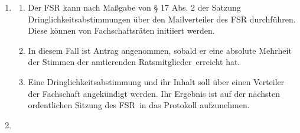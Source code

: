 \documentclass[a4paper, 12pt, ngerman]{article}
\newcommand{\rates}{FSR}
\newcommand{\go}{GO}
\newcommand{\mitglieder}{Ratsmitglieder}
\begin{document}
\begin{enumerate}[leftmargin=0cm]
	\begin{enumerate}[leftmargin=0cm]
		\item Die Sitzungsleitung gibt vor einer Abstimmung den Wortlaut 
		des Antrags bekannt.
		\item Im Falle konkurrierender Anträge ist über den weitestgehenden Antrag zuerst abzustimmen.
		Die Sitzungsleitung schlägt eine Reihung der Anträge vor; über Widerspruch einer antragsstellenden Person entscheiden die anwesenden \mitglieder~durch Abstimmung.
        Sobald ein Antrag die notwendige Mehrheit gefunden hat, entfallen alle Übrigen. 
		\item Abstimmungen erfolgen auf einer Sitzung grundsätzlich offen per Handzeichen.
		\item Die Bestimmung der Sitzungsleitung und der Protokollführung nach  gelten als Abstimmungen im Sinne dieser \go.
	\end{enumerate}
		

	\item {}\label{dringlichkeit}
	
	\begin{enumerate}[leftmargin=0cm]
		\item Der FSR kann nach Maßgabe von § 17 Abs. 2 der Satzung Dringlichkeitsabstimmungen über den Mailverteiler des FSR durchführen.
        Diese können von Fachschaftsräten initiiert werden.
		\item In diesem Fall ist Antrag angenommen, sobald er eine absolute Mehrheit der Stimmen der amtierenden \mitglieder~erreicht hat.
		\item Eine Dringlichkeitsabstimmung und ihr Inhalt soll über einen Verteiler der Fachschaft angekündigt werden. Ihr Ergebnis ist auf der nächsten ordentlichen Sitzung des \rates~in das Protokoll aufzunehmen.
	\end{enumerate}

	
	\item {}\label{go-antrage}
	

\end{enumerate}
\end{document}
